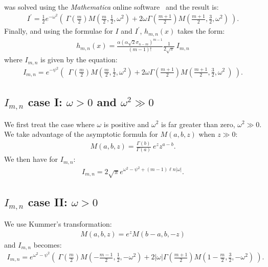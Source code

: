 \documentclass[a4paper,11pt]{article}
\begin{document}
was solved using the \emph{Mathematica} online software~\cite{math} and the result is:
\begin{align}
I^\prime = \frac{1}{2} e^{-\omega^2} 
\left(\  \Gamma\left( \frac{m}{2} \right) M\left( \frac{m}{2}, \frac{1}{2}, \omega^2 \right)  + 2\omega \Gamma\left( \frac{m+1}{2} \right) M\left(\frac{m+1}{2}, \frac{3}{2}, \omega^2  \right) \ \right).  
\end{align}
Finally, and using the formulae for $I$ and $I^\prime$, $h_{m,n}(x)$ takes the form:
\begin{align}
h_{m,n}(x) =  \frac{ \alpha (\alpha\sqrt{2} \sigma_{n-m})^{m-1}}{(m-1)!} \frac{1}{2\sqrt{\pi}} \  I_{m,n}
\end{align} 
where $I_{m,n}$  is given by the equation:
\begin{align}
I_{m,n} = e^{-\psi^2} \left(\  \ \Gamma\left( \frac{m}{2} \right) M\left( \frac{m}{2}, \frac{1}{2}, \omega^2 \right)  + 2\omega \Gamma\left( \frac{m+1}{2} \right) M\left(\frac{m+1}{2}, \frac{3}{2}, \omega^2 \ \right) \ \right).  
\end{align}

\subsection*{$I_{m,n}$ case I: $\omega> 0$ and $\omega^2 \gg 0$ }
%

We first treat the case where $\omega$ is positive and $\omega^2$ is far greater than zero, $\omega^2 \gg 0$.  
We take advantage of the asymptotic formula for $M(a,b,z)$ when $z \gg 0$:
\begin{align}
M(a,b,z) = \frac{\Gamma (b)}{\Gamma(a)} \  e^z z^{a-b}.
\end{align}
We then have for $I_{m,n}$:
\begin{align}
 I_{m,n} = 2\sqrt{\pi}   e^{\omega^2 - \psi^2 + (m-1) \ell n |\omega|}.
\end{align}

\subsection*{$I_{m,n}$ case II: $\omega >0$}
%

We use Kummer's transformation:
\begin{align}
M(a,b,z) = e^z M(b-a,b,-z)
\end{align}
and $I_{m,n}$ becomes:
\begin{align}
I_{m,n} = e^{\omega^2 -\psi^2 } \left(\  \Gamma\left( \frac{m}{2} \right) M\left(-\frac{m-1}{2}, \frac{1}{2}, -\omega^2 \right)  + 2|\omega| \Gamma\left( \frac{m+1}{2} \right) M\left(1-\frac{m}{2}, \frac{3}{2}, -\omega^2 \right)   \    \right).
\end{align}
\end{document}
